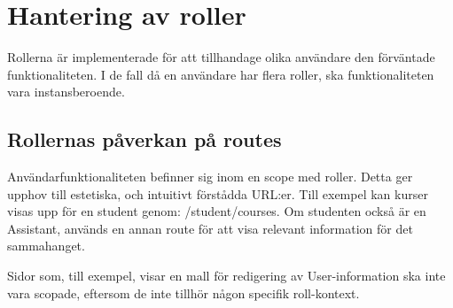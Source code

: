 \section{Hantering av roller}

Rollerna är implementerade för att tillhandage olika användare den förväntade funktionaliteten. I de fall då en användare har flera roller, ska funktionaliteten vara instansberoende.  

\subsection{Rollernas påverkan på routes}
Användarfunktionaliteten befinner sig inom en scope med roller. Detta ger upphov till estetiska, och intuitivt förstådda URL:er. Till exempel kan kurser visas upp för en student genom: /student/courses. Om studenten också är en Assistant, används en annan route för att visa relevant information för det sammahanget.

Sidor som, till exempel,  visar en mall för redigering av User-information ska inte vara scopade, eftersom de inte tillhör någon specifik roll-kontext.